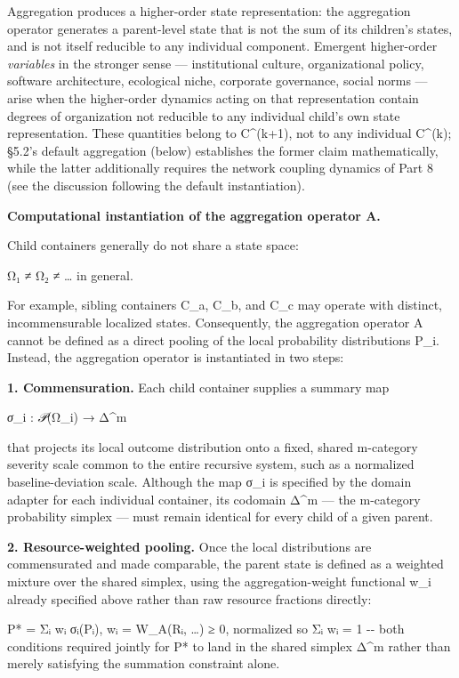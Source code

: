 \documentclass[
]{article}
\begin{document}
Aggregation produces a higher-order state representation: the
aggregation operator generates a parent-level state that is not the sum
of its children's states, and is not itself reducible to any individual
component. Emergent higher-order \emph{variables} in the stronger sense
--- institutional culture, organizational policy, software architecture,
ecological niche, corporate governance, social norms --- arise when the
higher-order dynamics acting on that representation contain degrees of
organization not reducible to any individual child's own state
representation. These quantities belong to C\^{}(k+1), not to any
individual C\^{}(k); §5.2's default aggregation (below) establishes the
former claim mathematically, while the latter additionally requires the
network coupling dynamics of Part 8 (see the discussion following the
default instantiation).

\textbf{Computational instantiation of the aggregation operator A.}

Child containers generally do not share a state space:

Ω₁ ≠ Ω₂ ≠ \ldots{} in general.

For example, sibling containers C\_a, C\_b, and C\_c may operate with
distinct, incommensurable localized states. Consequently, the
aggregation operator A cannot be defined as a direct pooling of the
local probability distributions P\_i. Instead, the aggregation operator
is instantiated in two steps:

\textbf{1. Commensuration.} Each child container supplies a summary map

\emph{σ}\_i : \emph{𝒫}(Ω\_i) → Δ\^{}m

that projects its local outcome distribution onto a fixed, shared
m-category severity scale common to the entire recursive system, such as
a normalized baseline-deviation scale. Although the map σ\_i is
specified by the domain adapter for each individual container, its
codomain Δ\^{}m --- the m-category probability simplex --- must remain
identical for every child of a given parent.

\textbf{2. Resource-weighted pooling.} Once the local distributions are
commensurated and made comparable, the parent state is defined as a
weighted mixture over the shared simplex, using the aggregation-weight
functional w\_i already specified above rather than raw resource
fractions directly:

P* = Σᵢ wᵢ σᵢ(Pᵢ), wᵢ = W\_A(Rᵢ, \ldots) ≥ 0, normalized so Σᵢ wᵢ = 1
-\/- both conditions required jointly for P* to land in the shared
simplex Δ\^{}m rather than merely satisfying the summation constraint
alone.
\end{document}
